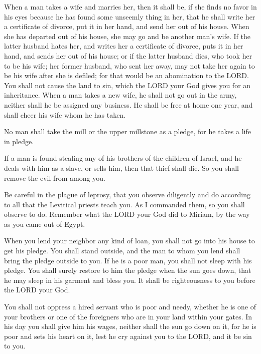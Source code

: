 \mychapter{} \myverse*{}When a man takes a wife and marries her, then it shall be, if
she finds no favor in his eyes because he has found some unseemly thing in her, that he shall write her
a certificate of divorce, put it in her hand, and send her out of his house.
\myverse{}When she has departed out of his house, she may go and be another man’s wife.
\myverse{}If the latter husband hates her, and writes her a certificate of divorce, puts
it in her hand, and sends her out of his house; or if the latter husband dies, who took her to be his
wife;
\myverse{}her former husband, who sent her away, may not take her again to be his wife
after she is defiled; for that would be an abomination to the LORD. You shall not cause the land to sin,
which the LORD your God gives you for an inheritance.
\myverse{}When a man takes a new wife, he shall not go out in the army, neither shall
he be assigned any business. He shall be free at home one year, and shall cheer his wife whom he has taken.

\myverse{}No man shall take the mill or the upper millstone as a pledge,
for he takes a life in pledge.

\myverse{}If a man is found stealing any of his brothers of the children
of Israel, and he deals with him as a slave, or sells him, then that thief shall die. So you shall remove
the evil from among you.

\myverse{}Be careful in the plague of leprosy, that you observe diligently
and do according to all that the Levitical priests teach you. As I commanded them, so you shall observe
to do.
\myverse{}Remember what the LORD your God did to Miriam, by the way as you came out of
Egypt.

\myverse{}When you lend your neighbor any kind of loan, you shall not
go into his house to get his pledge.
\myverse{}You shall stand outside, and the man to whom you lend shall bring the pledge
outside to you.
\myverse{}If he is a poor man, you shall not sleep with his pledge.
\myverse{}You shall surely restore to him the pledge when the sun goes down, that he
may sleep in his garment and bless you. It shall be righteousness to you before the LORD your God.

\myverse{}You shall not oppress a hired servant who is poor and needy,
whether he is one of your brothers or one of the foreigners who are in your land within your gates.
\myverse{}In his day you shall give him his wages, neither shall the sun go down on
it, for he is poor and sets his heart on it, lest he cry against you to the LORD, and it be sin to you.

